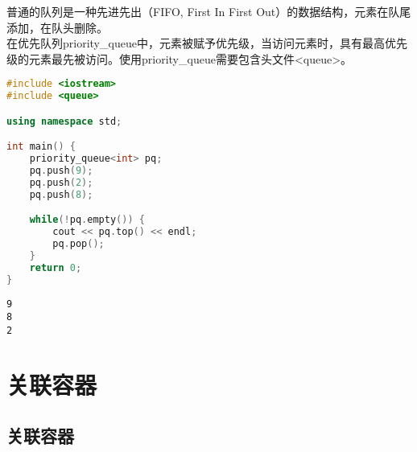 普通的队列是一种先进先出（FIFO, First In First Out）的数据结构，元素在队尾添加，在队头删除。\\

在优先队列priority\_queue中，元素被赋予优先级，当访问元素时，具有最高优先级的元素最先被访问。使用priority\_queue需要包含头文件<queue>。

\begin{table}[H]
	\centering
	\caption{priority\_queue操作}
\end{table}


\begin{lstlisting}[language=C++]
#include <iostream>
#include <queue>

using namespace std;

int main() {
	priority_queue<int> pq;
	pq.push(9);
	pq.push(2);
	pq.push(8);

	while(!pq.empty()) {
		cout << pq.top() << endl;
		pq.pop();
	}
	return 0;
}
\end{lstlisting}

\begin{tcolorbox}
	\begin{verbatim}
9
8
2
	\end{verbatim}
\end{tcolorbox}

\newpage

\section{关联容器}

\subsection{关联容器}

